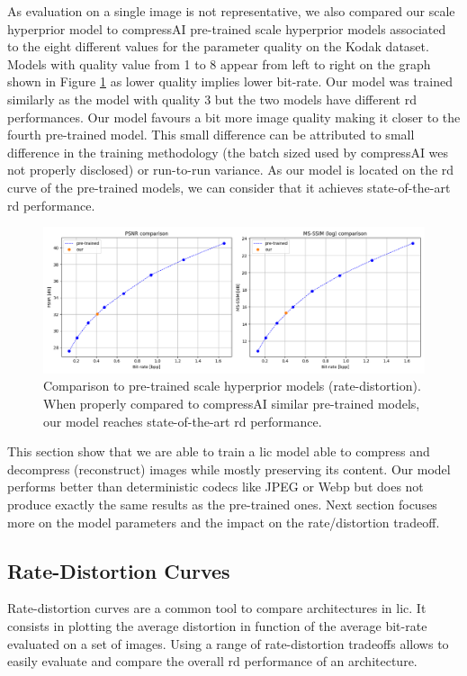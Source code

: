 As evaluation on a single image is not representative, we also compared our scale hyperprior model to compressAI pre-trained scale hyperprior models associated to the eight different values for the parameter \textsf{quality} on the Kodak dataset. Models with \textsf{quality} value from 1 to 8 appear from left to right on the graph shown in Figure \ref{balle_repro_6} as lower quality implies lower bit-rate. Our model was trained similarly as the model with \textsf{quality} 3 but the two models have different \acrshort{rd} performances. Our model favours a bit more image quality making it closer to the fourth pre-trained model. This small difference can be attributed to small difference in the training methodology (the batch sized used by compressAI wes not properly disclosed) or run-to-run variance. As our model is located on the \acrshort{rd} curve of the pre-trained models, we can consider that it achieves state-of-the-art \acrshort{rd} performance. 

\begin{figure}
    \centering
    \includegraphics[width=15cm]{img/balle_repro_6.png}
    \caption[Comparison to pre-trained scale hyperprior models (rate-distortion).]{Comparison to pre-trained scale hyperprior models (rate-distortion). When properly compared to compressAI similar pre-trained models, our model reaches state-of-the-art \acrshort{rd} performance.}
    \label{balle_repro_6}
\end{figure}

This section show that we are able to train a \acrshort{lic} model able to compress and decompress (reconstruct) images while mostly preserving its content. Our model performs better than deterministic codecs like JPEG or Webp but does not produce exactly the same results as the pre-trained ones. Next section focuses more on the model parameters and the impact on the rate/distortion tradeoff.

\subsection{Rate-Distortion Curves}
Rate-distortion curves are a common tool to compare  architectures in \acrshort{lic}. It consists in plotting the average distortion in function of the average bit-rate evaluated on a set of images. Using a range of rate-distortion tradeoffs allows to easily evaluate and compare the overall \acrshort{rd} performance of an architecture.

